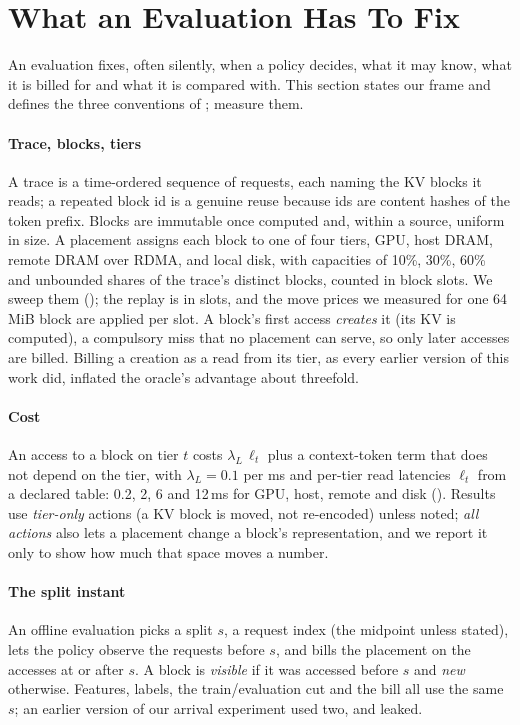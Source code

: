 \section{What an Evaluation Has To Fix}
\label{sec:defs}
An evaluation fixes, often silently, when a policy decides, what it may know, what it is billed for and what
it is compared with. This section states our frame and defines the three conventions of
;  measure them.

\paragraph{Trace, blocks, tiers} A trace is a time-ordered sequence of requests, each naming the KV
blocks it reads; a repeated block id is a genuine reuse because ids are content hashes of the token
prefix. Blocks are immutable once computed and, within a source, uniform in size. A placement assigns
each block to one of four tiers, GPU, host DRAM, remote DRAM over RDMA, and local disk, with capacities
of 10\%, 30\%, 60\% and unbounded shares of the trace's distinct blocks, counted in block slots.  We sweep them
(); the replay is in slots, and the move prices we measured for one 64\,MiB block are applied per
slot. A block's first access
\emph{creates} it (its KV is computed), a compulsory miss that no placement can serve, so only later
accesses are billed. Billing a creation as a read from its tier, as every earlier version of this work
did, inflated the oracle's advantage about threefold.

\paragraph{Cost} An access to a block on tier $t$ costs $\lambda_L\,\ell_t$ plus a context-token term
that does not depend on the tier, with $\lambda_L = 0.1$ per ms and per-tier read latencies $\ell_t$
from a declared table: 0.2, 2, 6 and 12\,ms for GPU, host, remote and disk (). Results use
\emph{tier-only} actions (a KV block is moved, not re-encoded) unless noted; \emph{all actions} also lets a
placement change a block's representation, and we report it only to show how much that space moves a number.

\paragraph{The split instant} An offline evaluation picks a split $s$, a request index (the midpoint
unless stated), lets the policy observe the requests before $s$, and bills the placement on the accesses at or after $s$. A block is \emph{visible} if it was
accessed before $s$ and \emph{new} otherwise. Features, labels, the train/evaluation cut and the bill all
use the same $s$; an earlier version of our arrival experiment used two, and leaked.

